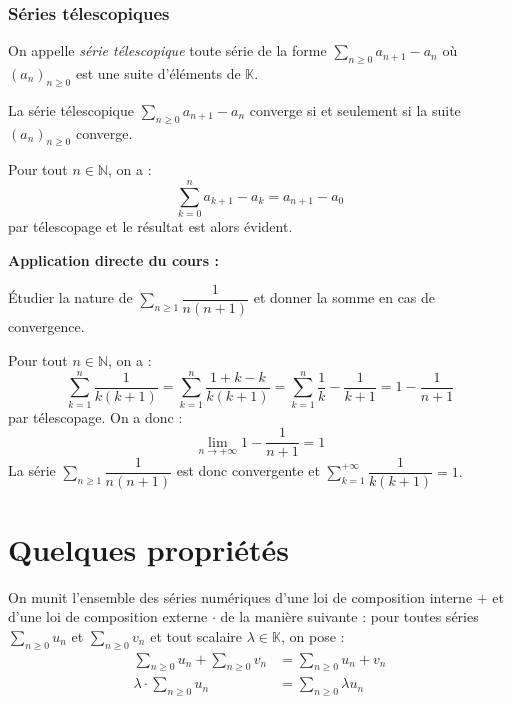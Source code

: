 \documentclass[french,11pt,twoside]{VcCours}
\newenvironment{ApplicationDirecte}{\textbf{Application directe du cours :}

}{}
\newcommand{\Sum}[2]{\ensuremath{\textstyle{\sum\limits_{#1}^{#2}}}}
\begin{document}
\newpage

\subsubsection{Séries télescopiques}

On appelle \emph{série télescopique} toute série de la forme $\Sum{n\geq 0}{} a_{n+1}-a_n$ où $(a_n)_{n \geq 0}$ est une suite d'éléments de $\mathbb{K}$.

\begin{Proposition}{}
La série télescopique $\Sum{n\geq 0}{} a_{n+1}-a_n$ converge si et seulement si la suite $(a_n)_{n \geq 0}$ converge.
\end{Proposition}

\begin{Demonstration}{} 

Pour tout $n \in \mathbb{N}$, on a :
$$ \sum_{k=0}^{n} a_{k+1}-a_k = a_{n+1}-a_0$$
par télescopage et le résultat est alors évident.
\end{Demonstration}

\medskip

\begin{ApplicationDirecte} Étudier la nature de $\Sum{n\geq 1}{} \dfrac{1}{n(n+1)}$ et donner la somme en cas de convergence.


Pour tout $n \in \mathbb{N}$, on a :
$$ \sum_{k=1}^{n} \frac{1}{k(k+1)} =   \sum_{k=1}^{n} \frac{1+k-k}{k(k+1)} =   \sum_{k=1}^{n} \frac{1}{k} - \frac{1}{k+1} = 1- \frac{1}{n+1}$$
par télescopage. On a donc :
$$ \lim_{n \rightarrow + \infty} 1- \frac{1}{n+1} = 1$$
La série $\Sum{n\geq 1}{} \dfrac{1}{n(n+1)}$ est donc convergente et $\Sum{k=1}{+\infty} \dfrac{1}{k(k+1)}  = 1.$
\end{ApplicationDirecte}


\section{Quelques propriétés}

On munit l'ensemble des séries numériques d'une loi de composition interne $+$ et d'une loi de composition externe $\cdot$ de la manière suivante : pour toutes séries $\Sum{n \geq 0}{} u_n$ et $\Sum{n \geq 0}{} v_n$ et tout scalaire $\lambda \in \mathbb{K}$, on pose :
\begin{align*}
\Sum{n \geq 0}{} u_n + \Sum{n \geq 0}{} v_n  & = \Sum{n \geq 0}{} u_n+v_n \\
\lambda \cdot \Sum{n \geq 0}{} u_n & = \Sum{n \geq 0}{} \lambda u_n
\end{align*}
\end{document}
